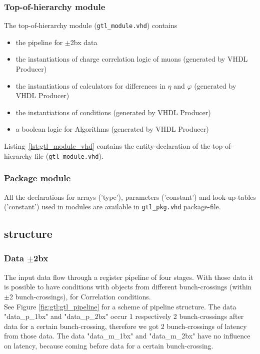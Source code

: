 \subsubsection{Top-of-hierarchy module}
\label{sec:gtl:top_module}

The top-of-hierarchy module (\texttt{gtl\_module.vhd}) contains 
\begin {itemize}
\item the pipeline for $\pm$2bx data
\item the instantiations of charge correlation logic of muons (generated by VHDL Producer)
\item the instantiations of calculators for differences in $\eta$ and $\varphi$ (generated by VHDL Producer)
\item the instantiations of conditions (generated by VHDL Producer)
\item a boolean logic for Algorithms (generated by VHDL Producer)
\end {itemize}

Listing~\ref{lst:gtl_module_vhd} contains the entity-declaration of the top-of-hierarchy file (\texttt{gtl\_module.vhd}).



\subsubsection{Package module}
\label{sec:gtl:package_module}

All the declarations for arrays ('type'), parameters ('constant') and look-up-tables ('constant') used in modules are available in \texttt{gtl\_pkg.vhd} package-file.

\clearpage

\subsection{\ugtl structure}
\label{sec:gtl:mgtl_structure}

\subsubsection{Data $\pm$2bx}
\label{sec:gtl:data_p_m_2bx}

The \ugtl input data flow through a register pipeline of four stages. With those data it is possible to have conditions with objects from
different bunch-crossings (within $\pm$2 bunch-crossings), \eg for Correlation conditions.\\
See Figure \ref{fig:gtl:gtl_pipeline} for a scheme of \ugtl pipeline structure. The data "data\_p\_1bx" and "data\_p\_2bx" occur 1 respectively 2 bunch-crossings
after data for a certain bunch-crossing, therefore we got 2 bunch-crossings of latency from those data. The data "data\_m\_1bx" and "data\_m\_2bx" have no influence
on latency, because coming before data for a certain bunch-crossing.

